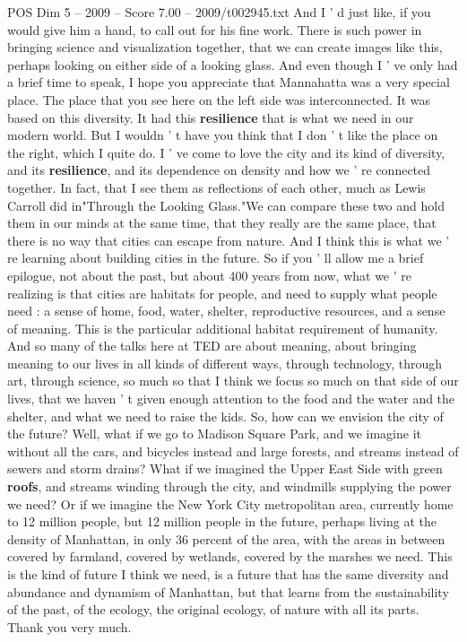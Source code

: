\begin{textsample}{POS Dim 5 – 2009 – Score 7.00 – 2009/t002945.txt}
And I ' d just like, if you would give him a hand, to call out for his fine work.
There is such power in bringing science and visualization together, that we can create images like this, perhaps looking on either side of a looking glass.
And even though I ' ve only had a brief time to speak, I hope you appreciate that Mannahatta was a very special place.
The place that you see here on the left side was interconnected.
It was based on this diversity.
It had this \textbf{resilience} that is what we need in our modern world.
But I wouldn ' t have you think that I don ' t like the place on the right, which I quite do.
I ' ve come to love the city and its kind of diversity, and its \textbf{resilience}, and its dependence on density and how we ' re connected together.
In fact, that I see them as reflections of each other, much as Lewis Carroll did in"Through the Looking Glass."We can compare these two and hold them in our minds at the same time, that they really are the same place, that there is no way that cities can escape from nature.
And I think this is what we ' re learning about building cities in the future.
So if you ' ll allow me a brief epilogue, not about the past, but about 400 years from now, what we ' re realizing is that cities are habitats for people, and need to supply what people need : a sense of home, food, water, shelter, reproductive resources, and a sense of meaning.
This is the particular additional habitat requirement of humanity.
And so many of the talks here at TED are about meaning, about bringing meaning to our lives in all kinds of different ways, through technology, through art, through science, so much so that I think we focus so much on that side of our lives, that we haven ' t given enough attention to the food and the water and the shelter, and what we need to raise the kids.
So, how can we envision the city of the future?
Well, what if we go to Madison Square Park, and we imagine it without all the cars, and bicycles instead and large forests, and streams instead of sewers and storm drains?
What if we imagined the Upper East Side with green \textbf{roofs}, and streams winding through the city, and windmills supplying the power we need?
Or if we imagine the New York City metropolitan area, currently home to 12 million people, but 12 million people in the future, perhaps living at the density of Manhattan, in only 36 percent of the area, with the areas in between covered by farmland, covered by wetlands, covered by the marshes we need.
This is the kind of future I think we need, is a future that has the same diversity and abundance and dynamism of Manhattan, but that learns from the sustainability of the past, of the ecology, the original ecology, of nature with all its parts.
Thank you very much.

\end{textsample}
